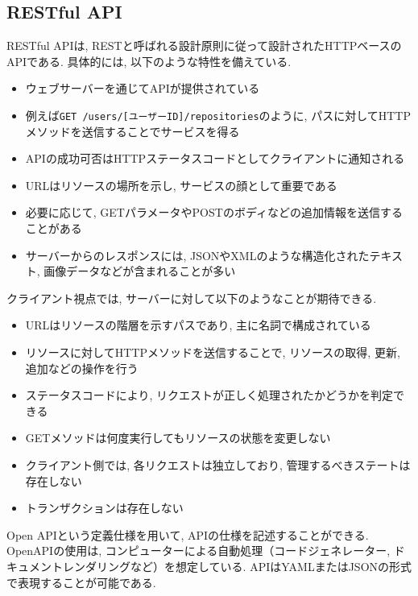 \documentclass[../../../main]{subfiles}
\begin{document}
    \subsection{RESTful API}\label{subsec:phraseology-restful-api}

    RESTful APIは, RESTと呼ばれる設計原則に従って設計されたHTTPベースのAPIである. 具体的には, 以下のような特性を備えている. \cite{RealWorldHTTP}

    \begin{itemize}
        \item ウェブサーバーを通じてAPIが提供されている
        \item 例えば\texttt{GET /users/[ユーザーID]/repositories}のように, パスに対してHTTPメソッドを送信することでサービスを得る
        \item APIの成功可否はHTTPステータスコードとしてクライアントに通知される
        \item URLはリソースの場所を示し, サービスの顔として重要である
        \item 必要に応じて, GETパラメータやPOSTのボディなどの追加情報を送信することがある
        \item サーバーからのレスポンスには, JSONやXMLのような構造化されたテキスト, 画像データなどが含まれることが多い
    \end{itemize}

    クライアント視点では, サーバーに対して以下のようなことが期待できる. \cite{RealWorldHTTP}

    \begin{itemize}
        \item URLはリソースの階層を示すパスであり, 主に名詞で構成されている
        \item リソースに対してHTTPメソッドを送信することで, リソースの取得, 更新, 追加などの操作を行う
        \item ステータスコードにより, リクエストが正しく処理されたかどうかを判定できる
        \item GETメソッドは何度実行してもリソースの状態を変更しない
        \item クライアント側では, 各リクエストは独立しており, 管理するべきステートは存在しない
        \item トランザクションは存在しない
    \end{itemize}

    Open APIという定義仕様を用いて, APIの仕様を記述することができる. OpenAPIの使用は, コンピューターによる自動処理（コードジェネレーター, ドキュメントレンダリングなど）を想定している. APIはYAMLまたはJSONの形式で表現することが可能である. \cite{APIデザインパターン}
\end{document}
